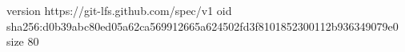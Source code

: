 version https://git-lfs.github.com/spec/v1
oid sha256:d0b39abc80ed05a62ca569912665a624502fd3f8101852300112b936349079e0
size 80

